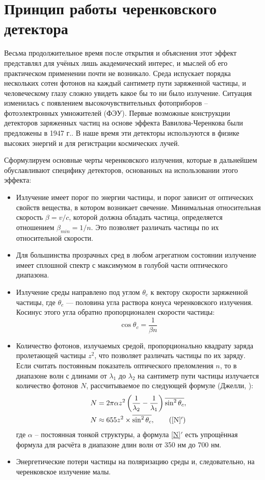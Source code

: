\documentclass[12pt,a4paper]{report} %
\begin{document}
\section{Принцип работы черенковского детектора}

Весьма продолжительное время после открытия и объяснения этот эффект представлял для учёных лишь академический интерес, и мыслей об его практическом применении почти не возникало. Среда испускает порядка нескольких сотен фотонов на каждый сантиметр пути заряженной частицы, и человеческому глазу  сложно увидеть какое бы то ни было излучение. Ситуация изменилась с появлением высокочувствительных фотоприборов – фотоэлектронных умножителей (ФЭУ). Первые возможные конструкции детекторов заряженных частиц на основе эффекта Вавилова-Черенкова были предложены в 1947 г.. В наше время эти детекторы используются в физике высоких энергий и для регистрации космических лучей.

Сформулируем основные черты черенковского излучения, которые в дальнейшем обуславливают специфику детекторов, основанных на использовании этого эффекта:
\begin{itemize}
	\item Излучение имеет порог по энергии частицы, и порог зависит от оптических свойств вещества, в котором возникает свечение. Минимальная относительная скорость $\beta = v/c$, которой должна обладать частица, определяется отношением $\beta_{min} = 1/n$. Это позволяет различать частицы по их относительной скорости.
	\item Для большинства прозрачных сред в любом агрегатном состоянии излучение имеет сплошной спектр с максимумом в голубой части оптического диапазона.
	\item Излучение среды направлено под углом $\theta_c$ к вектору скорости заряженной частицы, где $\theta_c$ --- половина угла раствора конуса черенковского излучения.
	 Косинус этого угла обратно пропорционален скорости частицы: 
\begin{equation} \label{costheta}
 \cos \theta_c = \frac{1}{\beta n}
\end{equation}
	\item Количество фотонов, излучаемых средой, пропорционально квадрату заряда пролетающей частицы $z^2$, что позволяет различать частицы по их заряду. Если считать постоянным показатель оптического преломления $n$, то в диапазоне волн с длинами от $\lambda_1$  до $\lambda_2$ на сантиметр пути частицы излучается количество фотонов $N$, рассчитываемое по следующей формуле (Джелли, \cite{Jelley}):
\begin{align}
& N = 2\pi\alpha z^2 \left( \frac{1}{\lambda_2} - \frac{1}{\lambda_1} \right)\overline{\sin^2 \theta_c},\label{N} \\
& N \approx 655 z^2 \times \overline{\sin^2 \theta_c}, \tag{\ref{N}$'$}
\end{align}
где $\alpha$ -- постоянная тонкой структуры, а формула \ref{N}$'$ есть упрощённая формула для расчёта в диапазоне длин волн от 350 нм до 700 нм.
	\item Энергетические потери частицы на поляризацию среды и, следовательно, на черенковское излучение малы. 
\end{itemize}
\end{document}
